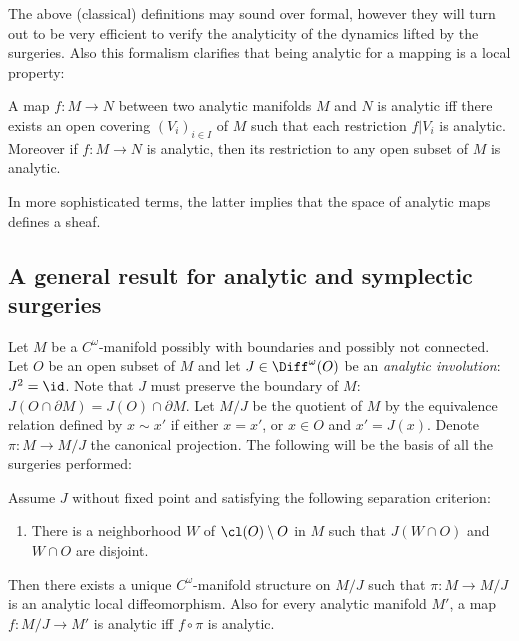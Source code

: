 The above (classical) definitions may sound over formal, however they will turn out to be very efficient to verify the analyticity of the dynamics lifted by the surgeries. Also this formalism clarifies that being analytic for a mapping is a local property:

\begin{proposition}\label{sheaf}
A map $f: M\to N$ between two analytic manifolds $M$ and $N$ is analytic iff
there exists an open covering $(V_i)_{i\in I}$ of $M$ such that each restriction $f|V_i$ is analytic.
Moreover if $f: M\to N$ is analytic, then its restriction to any open subset of $M$ is analytic.
\end{proposition}
In more sophisticated terms, the latter implies that the space of analytic maps defines a sheaf.

\subsection{A general result for analytic and symplectic surgeries}\label{S22}
Let $M$ be a $C^\omega$-manifold possibly with boundaries and possibly not connected. Let $O$ be an open subset of $M$ and let $J\in \Diff^\omega(O)$ be an \emph{analytic involution}: $J^2=\id$.
Note that $J$ must preserve the boundary of $M$: $J(O \cap \partial M)= J(O)\cap \partial M$. Let $M/J$ be the quotient of $M$ by the equivalence relation defined by $x\sim x'$ if either $x=x'$, or $x\in O $ and $x'= J(x)$.
Denote $\pi: M\to M/J$ the canonical projection.
The following will be the basis of all the surgeries performed:

\begin{theorem}\label{gluing} Assume $J$ without fixed point and satisfying the following separation criterion:
\begin{enumerate}\renewcommand{\theenumi}{C}
\item\label{enum:C}
There is a neighborhood $W $ of $\cl(O)\setminus O $ in $M$ such that $J(W\cap O)$ and $W \cap O $ are disjoint.
\end{enumerate}
Then there exists a unique $C^\omega$-manifold structure on $M/J$ such that $\pi: M\to M/J$ is an analytic local diffeomorphism. Also for every analytic manifold $M'$, a map $f: M/J \to M'$ is analytic iff $f\circ \pi $ is analytic.
\end{theorem}

